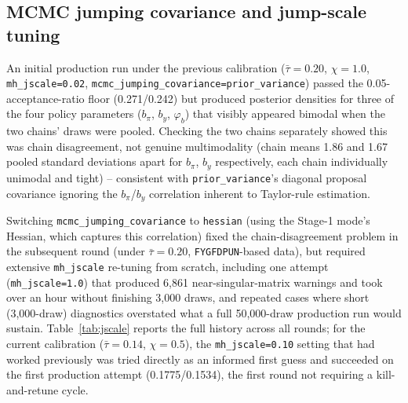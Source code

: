 \documentclass[11pt]{article}
\begin{document}
\subsection{MCMC jumping covariance and jump-scale tuning}
\label{sec:jumpcov}
An initial production run under the previous calibration
($\bar\tau=0.20$, $\chi=1.0$, \texttt{mh\_jscale=0.02},
\texttt{mcmc\_jumping\_covariance=prior\_variance}) passed the
0.05-acceptance-ratio floor (0.271/0.242) but produced posterior
densities for three of the four policy parameters ($b_\pi$, $b_y$,
$\varphi_b$) that visibly appeared bimodal when the two chains' draws
were pooled. Checking the two chains separately showed this was chain
disagreement, not genuine multimodality (chain means 1.86 and 1.67
pooled standard deviations apart for $b_\pi$, $b_y$ respectively, each
chain individually unimodal and tight) -- consistent with
\texttt{prior\_variance}'s diagonal proposal covariance ignoring the
$b_\pi$/$b_y$ correlation inherent to Taylor-rule estimation.

Switching \texttt{mcmc\_jumping\_covariance} to \texttt{hessian} (using
the Stage-1 mode's Hessian, which captures this correlation) fixed the
chain-disagreement problem in the subsequent round (under
$\bar\tau=0.20$, \texttt{FYGFDPUN}-based data), but required extensive
\texttt{mh\_jscale} re-tuning from scratch, including one attempt
(\texttt{mh\_jscale=1.0}) that produced 6{,}861 near-singular-matrix
warnings and took over an hour without finishing 3{,}000 draws, and
repeated cases where short (3{,}000-draw) diagnostics overstated what a
full 50{,}000-draw production run would sustain. Table~\ref{tab:jscale}
reports the full history across all rounds; for the current calibration
($\bar\tau=0.14$, $\chi=0.5$), the \texttt{mh\_jscale=0.10} setting that
had worked previously was tried directly as an informed first guess and
succeeded on the first production attempt (0.1775/0.1534), the first
round not requiring a kill-and-retune cycle.
\end{document}
